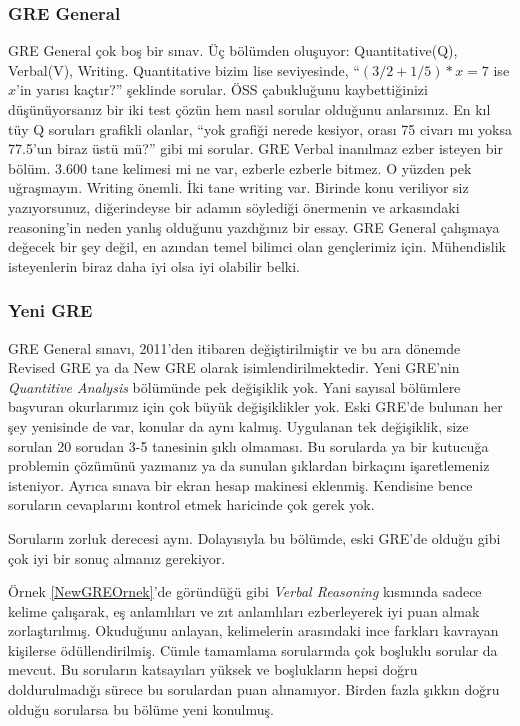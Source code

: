 \documentclass[12pt]{article}
\theoremstyle{break}
\begin{document}
\subsubsection{GRE General}
\label{GREGeneral}
GRE General çok boş bir sınav. Üç bölümden oluşuyor: Quantitative(Q), Verbal(V), Writing. Quantitative bizim lise seviyesinde, “$(3/2+1/5)*x=7$ ise $x$’in yarısı kaçtır?” şeklinde sorular. ÖSS çabukluğunu kaybettiğinizi düşünüyorsanız bir iki test çözün hem nasıl sorular olduğunu anlarsınız. En kıl tüy Q soruları grafikli olanlar, “yok grafiği nerede kesiyor, orası 75 civarı mı yoksa 77.5’un biraz üstü mü?” gibi mi sorular. GRE Verbal inanılmaz ezber isteyen bir bölüm. 3.600 tane kelimesi mi ne var, ezberle ezberle bitmez. O yüzden pek uğraşmayın. Writing önemli. İki tane writing var. Birinde konu veriliyor siz yazıyorsunuz, diğerindeyse bir adamın söylediği önermenin ve arkasındaki reasoning’in neden yanlış olduğunu yazdığınız bir essay. GRE General çalışmaya değecek bir şey değil, en azından temel bilimci olan gençlerimiz için. Mühendislik isteyenlerin biraz daha iyi olsa iyi olabilir belki.

\subsubsection{Yeni GRE}

GRE General sınavı, 2011'den itibaren değiştirilmiştir ve bu ara dönemde Revised GRE ya da New GRE olarak isimlendirilmektedir. Yeni GRE’nin \emph{Quantitive Analysis} bölümünde pek değişiklik yok. Yani sayısal bölümlere başvuran okurlarımız için çok büyük değişiklikler yok. Eski GRE’de bulunan her şey yenisinde de var, konular da aynı kalmış. Uygulanan tek değişiklik, size sorulan 20 sorudan 3-5 tanesinin şıklı olmaması. Bu sorularda ya bir kutucuğa problemin çözümünü yazmanız ya da sunulan şıklardan birkaçını işaretlemeniz isteniyor. Ayrıca sınava bir ekran hesap makinesi eklenmiş. Kendisine bence soruların cevaplarını kontrol etmek haricinde çok gerek yok. 

Soruların zorluk derecesi aynı. Dolayısıyla bu bölümde, eski GRE’de olduğu gibi çok iyi bir sonuç almanız gerekiyor.

Örnek \ref{NewGREOrnek}'de göründüğü gibi \emph{Verbal Reasoning} kısmında sadece kelime çalışarak, eş anlamlıları ve zıt anlamlıları ezberleyerek iyi puan almak zorlaştırılmış. Okuduğunu anlayan, kelimelerin arasındaki ince farkları kavrayan kişilerse ödüllendirilmiş. Cümle tamamlama sorularında çok boşluklu sorular da mevcut. Bu soruların katsayıları yüksek ve boşlukların hepsi doğru doldurulmadığı sürece bu sorulardan puan alınamıyor. Birden fazla şıkkın doğru olduğu sorularsa bu bölüme yeni konulmuş.
\end{document}
